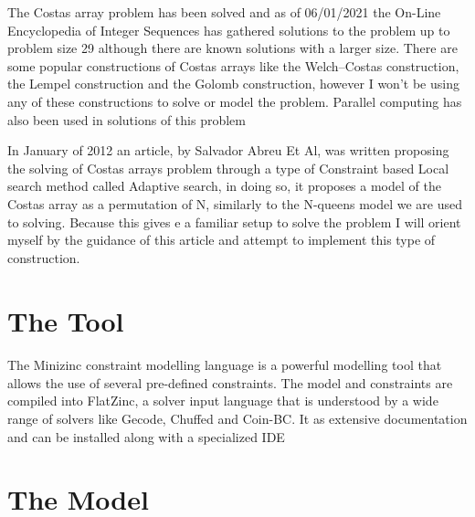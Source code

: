 \documentclass[runningheads]{llncs}
\begin{document}
The Costas array problem has been solved and as of 06/01/2021 the On-Line Encyclopedia of Integer Sequences has gathered solutions to the problem up to problem size 29\cite{int} although there are known solutions with a larger size.
There are some popular constructions of Costas arrays like the Welch–Costas construction, the Lempel construction and the Golomb construction, however I won't be using any of these constructions to solve or model the problem. Parallel computing has also been used in solutions of this problem

In January of 2012 an article, by Salvador Abreu Et Al\cite{spa}, was written proposing the solving of Costas arrays problem through a type of Constraint based Local search method called Adaptive search\cite{adaptive}, in doing so, it proposes a model of the Costas array as a permutation of N, similarly to the N-queens\cite{queens} model we are used to solving.
Because this gives e a familiar setup to solve the problem I will orient myself by the guidance of this article and attempt to implement this type of construction.


\section{The Tool}
\paragraph{}

The Minizinc\cite{minizinc} constraint modelling language is a powerful modelling tool that allows the use of several pre-defined constraints. The model and constraints are compiled into FlatZinc, a solver input language that is understood by a wide range of solvers like Gecode, Chuffed and Coin-BC. It as extensive documentation and can be installed along with a specialized IDE


\section{The Model}
\paragraph{}
\end{document}
